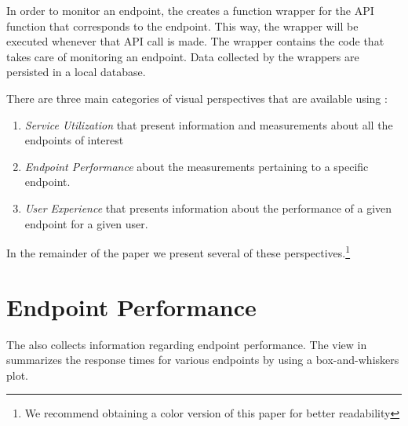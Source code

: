 \documentclass[conference]{IEEEtran}
\begin{document}
  In order to monitor an endpoint, the \tool creates a function wrapper for the API function that corresponds to the endpoint. This way, the wrapper will be executed whenever that API call is made. The wrapper contains the code that takes care of monitoring an endpoint. Data collected by the wrappers are persisted in a local database.

  There are three main categories of visual perspectives that are available using \tool:
  \begin{enumerate}
    \item \textit{Service Utilization} that present information and measurements about all the endpoints of interest
    \item \textit{Endpoint Performance} about the measurements pertaining to a specific endpoint.
    \item \textit{User Experience} that presents information about the performance of a given endpoint for a given user.
  \end{enumerate}

  In the remainder of the paper we present several of these perspectives.\footnote{We recommend obtaining a color version of this paper for better readability}






\section{Endpoint Performance}
\label{sec:perf}

  The \tool also collects information regarding endpoint performance. The view in  summarizes the response times for various endpoints by using a box-and-whiskers plot. 
\end{document}
